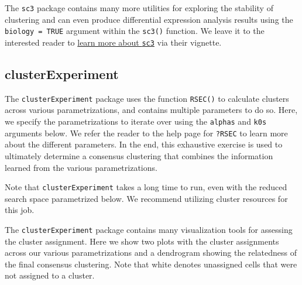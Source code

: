 \documentclass[]{book}
\newenvironment{Shaded}{\begin{snugshade}}{\end{snugshade}}
\newcommand{\DataTypeTok}[1]{\textcolor[rgb]{0.13,0.29,0.53}{#1}}
\newcommand{\DecValTok}[1]{\textcolor[rgb]{0.00,0.00,0.81}{#1}}
\newcommand{\FloatTok}[1]{\textcolor[rgb]{0.00,0.00,0.81}{#1}}
\newcommand{\KeywordTok}[1]{\textcolor[rgb]{0.13,0.29,0.53}{\textbf{#1}}}
\newcommand{\NormalTok}[1]{#1}
\newcommand{\OperatorTok}[1]{\textcolor[rgb]{0.81,0.36,0.00}{\textbf{#1}}}
\newcommand{\StringTok}[1]{\textcolor[rgb]{0.31,0.60,0.02}{#1}}
\begin{document}
The \texttt{sc3} package contains many more utilities for exploring the stability of clustering and can even produce differential expression analysis results using the \texttt{biology\ =\ TRUE} argument within the \texttt{sc3()} function. We leave it to the interested reader to \href{https://bioconductor.org/packages/release/bioc/html/SC3.html}{learn more about \texttt{sc3}} via their vignette.

\hypertarget{clusterexperiment}{%
\subsection{clusterExperiment}\label{clusterexperiment}}

The \texttt{clusterExperiment} package uses the function \texttt{RSEC()} to calculate clusters across various parametrizations, and contains multiple parameters to do so. Here, we specify the parametrizations to iterate over using the \texttt{alphas} and \texttt{k0s} arguments below. We refer the reader to the help page for \texttt{?RSEC} to learn more about the different parameters. In the end, this exhaustive exercise is used to ultimately determine a consensus clustering that combines the information learned from the various parametrizations.

Note that \texttt{clusterExperiment} takes a long time to run, even with the reduced search space parametrized below. We recommend utilizing cluster resources for this job.

\begin{Shaded}
\end{Shaded}

The \texttt{clusterExperiment} package contains many visualization tools for assessing the cluster assignment. Here we show two plots with the cluster assignments across our various parametrizations and a dendrogram showing the relatedness of the final consensus clustering. Note that white denotes unassigned cells that were not assigned to a cluster.
\end{document}
